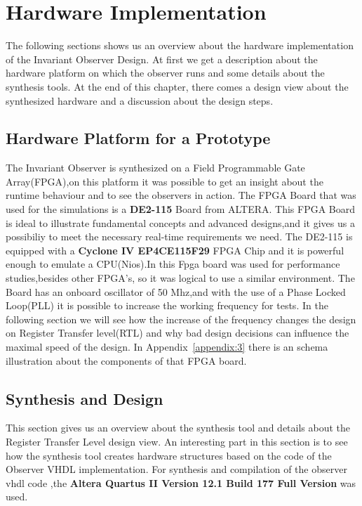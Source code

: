 \chapter{Hardware Implementation}

\ifpdf
    \graphicspath{{Chapter3/Figs/Raster/}{Chapter3/Figs/PDF/}{Chapter3/Figs/}}
\else
    \graphicspath{{Chapter3/Figs/Vector/}{Chapter3/Figs/}}
\fi

The following sections shows us an overview about the hardware implementation of the Invariant Observer Design.
At first we get a description about the hardware platform on which the observer runs and some details
about the synthesis tools.
At the end of this chapter, there comes a design view about the synthesized hardware and a discussion about 
the design steps.
\section{Hardware Platform for a Prototype}
The Invariant Observer is synthesized on a Field Programmable Gate Array(FPGA),on this platform it was possible to get an insight
about the runtime behaviour and to see the observers in action. 
The FPGA Board that was used for the simulations is a \textbf{DE2-115} Board from ALTERA\cite{altera1}.
This FPGA Board is ideal to illustrate fundamental concepts and advanced designs,and it gives us a possibiliy
to meet the necessary real-time requirements we need. The DE2-115 is equipped with a \textbf{Cyclone IV EP4CE115F29} 
FPGA Chip and it is powerful enough to emulate a CPU(Nios).In \cite{RTFMBJ13} this Fpga board was used for performance studies,besides other FPGA's,
so it was logical to use a similar environment.
The Board has an onboard oscillator of 50 Mhz,and with the use of a Phase Locked Loop(PLL) it is possible to increase the working frequency for tests.
In the following section we will see how the increase of the frequency changes the design on Register Transfer level(RTL) and why bad design decisions 
can influence the maximal speed of the design. In Appendix~\ref{appendix:3} there is an schema illustration about the components of that FPGA board.


\section{Synthesis and Design}
This section gives us an overview about the synthesis tool and details about the Register Transfer Level design view.
An interesting part in this section is to see how the synthesis tool creates hardware structures based on the code of the
Observer VHDL implementation.\newline
For synthesis and compilation of the observer vhdl code ,the \textbf{Altera Quartus II Version 12.1 Build 177 Full Version} was used.
